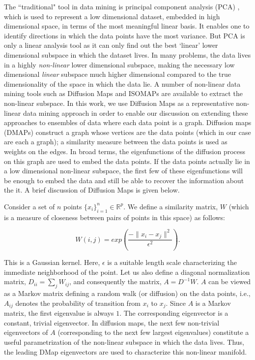 The ``traditional" tool in data mining is principal component analysis
(PCA) \cite{Shle03tutorial}, which is used to represent a low
dimensional dataset, embedded in high dimensional space, in terms of
the most meaningful linear basis. It enables one to identify
directions in which the data points have the most variance. But PCA is
only a linear analysis tool as it can only find out the best `linear'
lower dimensional subspace in which the dataset lives. In many
problems, the data lives in a highly \textit{non-linear} lower
dimensional subspace, making the necessary low dimensional
\textit{linear} subspace much higher dimensional compared to the true
dimensionality of the space in which the data lie. A number of
non-linear data mining tools such as Diffusion Maps
\cite{Nadl05diffusion,Nadl06diffusion} and ISOMAPs \cite{Tene00global}
are available to extract the non-linear subspace.  In this work, we
use Diffusion Maps as a representative non-linear data mining approach
in order to enable our discussion on extending these approaches to
ensembles of data where each data point is a graph.
% 
Diffusion maps (DMAPs) construct a graph whose vertices are the data
points (which in our case are each a graph); a similarity measure
between the data points is used as weights on the edges. In broad
terms, the eigenfunctions of the diffusion process on this graph are
used to embed the data points. If the data points actually lie in a
low dimensional non-linear subspace, the first few of these
eigenfunctions will be enough to embed the data and still be able to
recover the information about the it. A brief discussion of Diffusion
Maps is given below.

Consider a set of $n$ points $\{x_i\}_{i=1}^n \in \mathbb{R}^p$. We
define a similarity matrix, $W$ (which is a measure of closeness
between pairs of points in this space) as follows:

\begin{equation}
  W(i,j) = exp \left( \frac{-\|x_i-x_j\|^2}{\epsilon^2} \right).
  \label{eq:sim}
\end{equation}

% 
This is a Gaussian kernel. Here, $\epsilon$ is a suitable length scale
characterizing the immediate neighborhood of the point. Let us also
define a diagonal normalization matrix, $D_{ii}=\sum_j W_{ij}$, and
consequently the matrix, $A=D^{-1} W$. $A$ can be viewed as a Markov
matrix defining a random walk (or diffusion) on the data points, i.e.,
$A_{ij}$ denotes the probability of transition from $x_i$ to
$x_j$. Since $A$ is a Markov matrix, the first eigenvalue is always
$1$. The corresponding eigenvector is a constant, trivial
eigenvector. In diffusion maps, the next few non-trivial eigenvectors
of $A$ (corresponding to the next few largest eigenvalues) constitute
a useful parametrization of the non-linear subspace in which the data
lives. Thus, the leading DMap eigenvectors are used to characterize
this non-linear manifold.


